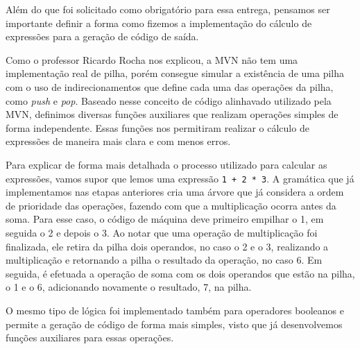 
Além do que foi solicitado como obrigatório para essa entrega, pensamos ser importante definir a forma como fizemos a implementação do cálculo de expressões para a geração de código de saída.

Como o professor Ricardo Rocha nos explicou, a MVN não tem uma implementação real de pilha, porém consegue simular a existência de uma pilha com o uso de indirecionamentos que define cada uma das operações da pilha, como \emph{push} e \emph{pop}. Baseado nesse conceito de código alinhavado utilizado pela MVN, definimos diversas funções auxiliares que realizam operações simples de forma independente. Essas funções nos permitiram realizar o cálculo de expressões de maneira mais clara e com menos erros.

Para explicar de forma mais detalhada o processo utilizado para calcular as expressões, vamos supor que lemos uma expressão \verb=1 + 2 * 3=. A gramática que já implementamos nas etapas anteriores cria uma árvore que já considera a ordem de prioridade das operações, fazendo com que a multiplicação ocorra antes da soma. Para esse caso, o código de máquina deve primeiro empilhar o 1, em seguida o 2 e depois o 3. Ao notar que uma operação de multiplicação foi finalizada, ele retira da pilha dois operandos, no caso o 2 e o 3, realizando a multiplicação e retornando a pilha o resultado da operação, no caso 6. Em seguida, é efetuada a operação de soma com os dois operandos que estão na pilha, o 1 e o 6, adicionando novamente o resultado, 7, na pilha.

O mesmo tipo de lógica foi implementado também para operadores booleanos e permite a geração de código de forma mais simples, visto que já desenvolvemos funções auxiliares para essas operações. 
